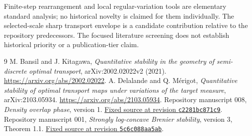 Finite-step rearrangement and local regular-variation tools are elementary standard analysis; no historical novelty is claimed for them individually. The selected-scale sharp transport envelope is a candidate contribution relative to the repository predecessors. The focused literature screening does not establish historical priority or a publication-tier claim.

\begin{thebibliography}{9}
 M. Bansil and J. Kitagawa, \emph{Quantitative stability in the geometry of semi-discrete optimal transport}, arXiv:2002.02022v2 (2021). \url{https://arxiv.org/abs/2002.02022}.
 A. Delalande and Q. M\'erigot, \emph{Quantitative stability of optimal transport maps under variations of the target measure}, arXiv:2103.05934. \url{https://arxiv.org/abs/2103.05934}.
 Repository manuscript 008, \emph{Density overlap phase}, version 1. \href{https://github.com/mxym/math/blob/c2281bc871c9bf60994985d6665ae45f4711d080/preprints/008-density-overlap-phase/v1/main.tex}{Fixed source at revision \texttt{c2281bc871c9}}.
 Repository manuscript 001, \emph{Strongly log-concave Brenier stability}, version 3, Theorem 1.1. \href{https://github.com/mxym/math/blob/5c6c088aa5abf1c1a4bdca6a8ce5beaa27faaef3/preprints/001-strongly-log-concave-brenier/v3/manuscript.tex}{Fixed source at revision \texttt{5c6c088aa5ab}}.
\end{thebibliography}

